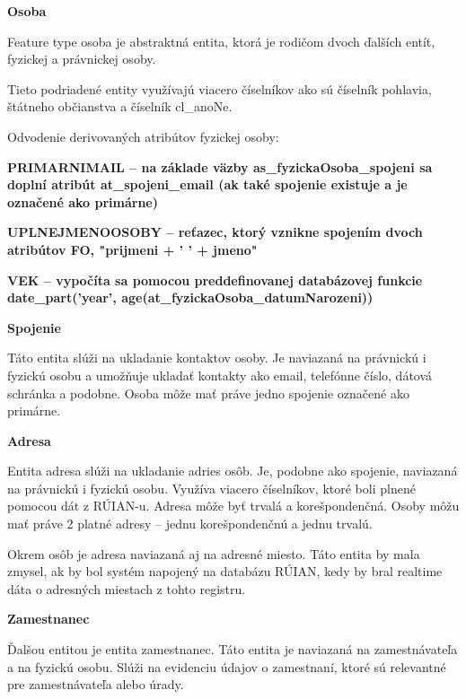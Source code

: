 \blank
\start
\setupindenting[no]
\start\bf Osoba \stop
\stop

Feature type osoba je abstraktná entita, ktorá je rodičom dvoch ďalších entít, fyzickej a právnickej osoby. 

Tieto podriadené entity využívajú viacero číselníkov ako sú číselník pohlavia, štátneho občianstva a číselník cl_anoNe.

\blank
Odvodenie derivovaných atribútov fyzickej osoby: %



\startitemize
\item {\start\bf PRIMARNIMAIL \stop -- na základe väzby as_fyzickaOsoba_spojeni sa doplní atribút at_spojeni_email (ak také spojenie existuje a je označené ako primárne)}
\item {\start\bf UPLNEJMENOOSOBY \stop -- reťazec, ktorý vznikne spojením dvoch atribútov FO, "prijmeni + ' ' + jmeno"}
\item {\start\bf VEK \stop -- vypočíta sa pomocou preddefinovanej databázovej funkcie \zlom date_part('year', age(at_fyzickaOsoba_datumNarozeni)) }
\stopitemize

\blank
\start
\setupindenting[no]
\start\bf Spojenie \stop
\stop

Táto entita slúži na ukladanie kontaktov osoby. Je naviazaná na právnickú i fyzickú osobu a umožňuje ukladať kontakty ako email, telefónne číslo, dátová schránka a podobne. Osoba môže mať práve jedno spojenie označené ako primárne.

\blank
\start
\setupindenting[no]
\start\bf Adresa \stop
\stop

Entita adresa slúži na ukladanie adries osôb. Je, podobne ako spojenie, naviazaná na právnickú i fyzickú osobu. Využíva viacero číselníkov, ktoré boli plnené pomocou dát z RÚIAN-u. Adresa môže byť trvalá a korešpondenčná. Osoby môžu mať práve 2 platné adresy -- jednu korešpondenčnú a jednu trvalú.

Okrem osôb je adresa naviazaná aj na adresné miesto. Táto entita by mala zmysel, ak by bol systém napojený na databázu RÚIAN, kedy by bral realtime dáta o adresných miestach z tohto registru.

\blank
\start
\setupindenting[no]
\start\bf Zamestnanec \stop
\stop

Ďalšou entitou je entita zamestnanec. Táto entita je naviazaná na zamestnávateľa a na fyzickú osobu. Slúži na evidenciu údajov o zamestnaní, ktoré sú relevantné pre zamestnávateľa alebo úrady.

